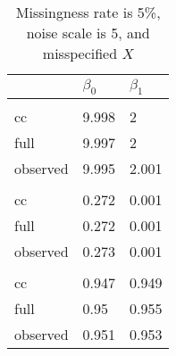 \documentclass[
  twocolumn]{article}
\begin{document}
\begin{table}[h]
\caption{Missingness rate is 5\%, noise scale is 5, and misspecified $X$}
\begingroup\fontsize{7}{9}\selectfont

\begin{tabu} to 
\toprule
 & $\beta_0$ & $\beta_1$\\
\midrule
\addlinespace[0.3em]
\\
\hspace{1em}cc & 9.998 & 2\\
\hspace{1em}full & 9.997 & 2\\
\hspace{1em}observed & 9.995 & 2.001\\
\addlinespace[0.3em]
\\
\hspace{1em}cc & 0.272 & 0.001\\
\hspace{1em}full & 0.272 & 0.001\\
\hspace{1em}observed & 0.273 & 0.001\\
\addlinespace[0.3em]
\\
\hspace{1em}cc & 0.947 & 0.949\\
\hspace{1em}full & 0.95 & 0.955\\
\hspace{1em}observed & 0.951 & 0.953\\
\bottomrule
\end{tabu}
\endgroup{}
\end{table}
\end{document}
